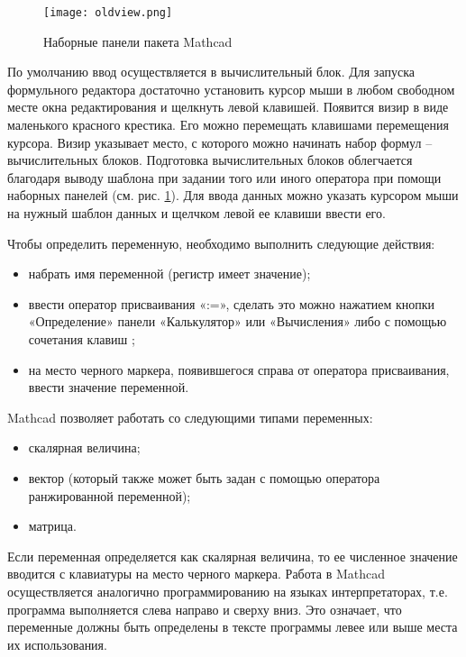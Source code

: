 \begin{figure}[h]
	\begin{center}
		\texttt{[image: oldview.png]}
	\end{center}
	\caption{Наборные панели пакета Mathcad} \label{fig:oldmathcad.view}
\end{figure}

По умолчанию ввод осуществляется в вычислительный блок. Для запуска формульного редактора достаточно установить курсор мыши в любом свободном месте окна редактирования и щелкнуть левой клавишей. Появится визир в виде маленького красного крестика. Его можно перемещать клавишами перемещения курсора. Визир указывает место, с которого можно начинать набор формул – вычислительных блоков. Подготовка вычислительных блоков облегчается благодаря выводу шаблона при задании того или иного оператора при помощи наборных панелей (см. рис. \ref{fig:oldmathcad.view}). Для ввода данных можно указать курсором мыши на нужный шаблон данных и щелчком левой ее клавиши ввести его.

Чтобы определить переменную, необходимо выполнить следующие действия:
\begin{itemize}
	\item набрать имя переменной (регистр имеет значение);
	\item ввести оператор присваивания «:=», сделать это можно нажатием кнопки «Определение» панели «Калькулятор» или «Вычисления» либо с помощью сочетания клавиш \keys{\shift+:};
	\item на место черного маркера, появившегося справа от оператора присваивания, ввести значение переменной.
\end{itemize}
Mathcad позволяет работать со следующими типами переменных:
\begin{itemize}
\item скалярная величина;
\item вектор (который также может быть задан с помощью оператора ранжированной переменной);
\item матрица.
\end{itemize}

Если переменная определяется как скалярная величина, то ее численное значение вводится с клавиатуры на место черного маркера. Работа в Mathcad осуществляется аналогично программированию на языках интерпретаторах, т.е. программа выполняется слева направо и сверху вниз. Это означает, что переменные должны быть определены в тексте программы левее или выше места их использования.

